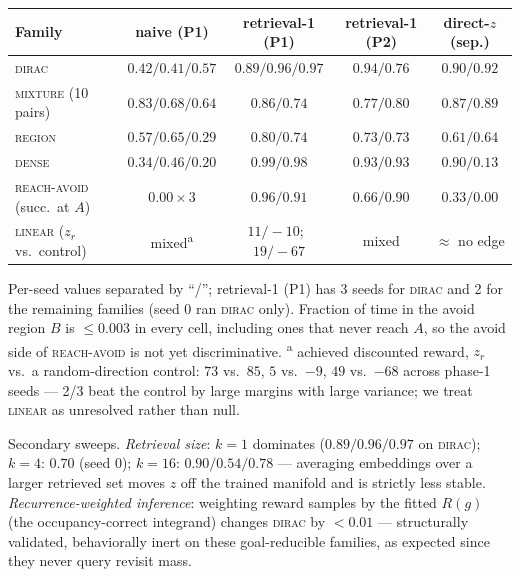 \documentclass[10pt]{article}
\begin{document}
\begin{table}[h]
\centering
\small
\setlength{\tabcolsep}{5pt}
\renewcommand{\arraystretch}{1.12}
\begin{tabular}{l c c c c}
\toprule
\textbf{Family} & \textbf{naive (P1)} & \textbf{retrieval-1 (P1)} & \textbf{retrieval-1 (P2)} & \textbf{direct-$z$ (sep.)} \\
\midrule
\textsc{dirac} & $0.42/0.41/0.57$ & $0.89/0.96/0.97$ & $0.94/0.76$ & $0.90/0.92$ \\
\textsc{mixture} (10 pairs) & $0.83/0.68/0.64$ & $0.86/0.74$ & $0.77/0.80$ & $0.87/0.89$ \\
\textsc{region} & $0.57/0.65/0.29$ & $0.80/0.74$ & $0.73/0.73$ & $0.61/0.64$ \\
\textsc{dense} & $0.34/0.46/0.20$ & $0.99/0.98$ & $0.93/0.93$ & $0.90/\mathbf{0.13}$ \\
\textsc{reach-avoid} (succ.\ at $A$) & $0.00\times3$ & $0.96/0.91$ & $0.66/0.90$ & $0.33/0.00$ \\
\textsc{linear} ($z_r$ vs.\ control) & mixed\textsuperscript{a} & $11/{-}10$;\ $19/{-}67$ & mixed & $\approx$ no edge \\
\bottomrule
\end{tabular}

\vspace{2pt}
\raggedright\footnotesize
Per-seed values separated by ``/''; retrieval-1 (P1) has 3 seeds for \textsc{dirac}
and 2 for the remaining families (seed 0 ran \textsc{dirac} only).
Fraction of time in the avoid region $B$ is $\le 0.003$ in every cell, including ones
that never reach $A$, so the avoid side of \textsc{reach-avoid} is not yet
discriminative.
\textsuperscript{a} achieved discounted reward, $z_r$ vs.\ a random-direction
control: $73$ vs.\ $85$, $5$ vs.\ $-9$, $49$ vs.\ $-68$ across phase-1 seeds ---
2/3 beat the control by large margins with large variance; we treat \textsc{linear}
as unresolved rather than null.
\label{tab:zs}
\end{table}

Secondary sweeps.
\emph{Retrieval size}: $k{=}1$ dominates ($0.89/0.96/0.97$ on \textsc{dirac});
$k{=}4$: $0.70$ (seed 0); $k{=}16$: $0.90/0.54/0.78$ --- averaging embeddings over a
larger retrieved set moves $z$ off the trained manifold and is strictly less stable.
\emph{Recurrence-weighted inference}: weighting reward samples by the fitted $R(g)$
(the occupancy-correct integrand) changes \textsc{dirac} by $<0.01$ --- structurally
validated, behaviorally inert on these goal-reducible families, as expected since
they never query revisit mass.
\end{document}
